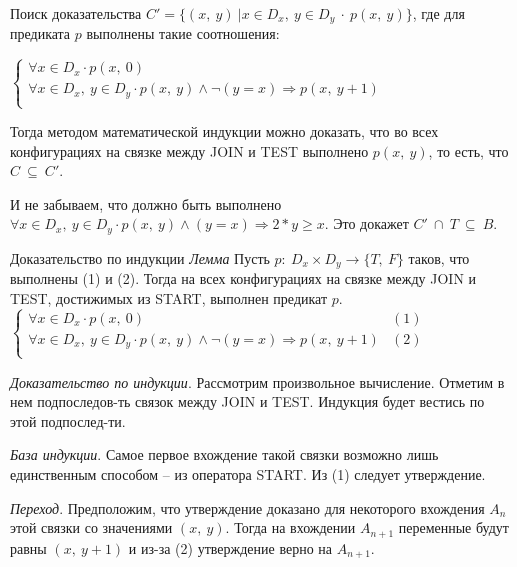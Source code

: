 \documentclass[hyperref={unicode=true}]{beamer}
\begin{document}
    \begin{frame}{Поиск доказательства}
    $C' = \{(x,~y)~|x \in D_x,~y \in D_y~\cdot~p(x,~y)\}$, где для предиката $p$ выполнены такие соотношения:

    $\begin{cases}
    \forall x \in D_x \cdot p(x,~0)\\
    \forall x \in D_x,~y \in D_y \cdot p(x,~y) \land \neg (y = x) \Rightarrow p(x,~y + 1)\\
    \end{cases}$

    Тогда методом математической индукции можно доказать, что во всех конфигурациях на связке между JOIN и TEST выполнено $p(x,~y)$, то есть, что $C~\subseteq~C'$.

    И не забываем, что должно быть выполнено $\forall x \in D_x,~y \in D_y \cdot p(x,~y) \land (y = x) \Rightarrow 2 * y \geq x$. Это докажет $C'~\cap~T~\subseteq~B$.
    \end{frame}

    \begin{frame}{Доказательство по индукции}
    \emph{Лемма} Пусть $p:~D_x \times D_y \rightarrow \{T,~F\}$ таков, что выполнены (1) и (2). Тогда на всех конфигурациях на связке между JOIN и TEST, достижимых из START, выполнен предикат $p$.
    $\begin{cases}
    \forall x \in D_x \cdot p(x,~0) & (1)\\
    \forall x \in D_x,~y \in D_y \cdot p(x,~y) \land \neg (y = x) \Rightarrow p(x,~y + 1) & (2)\\
     \end{cases}$

    \emph{Доказательство по индукции}. Рассмотрим произвольное вычисление. Отметим в нем подпоследов-ть связок между JOIN и TEST. Индукция будет вестись по этой подпослед-ти.

    \emph{База индукции}. Самое первое вхождение такой связки возможно лишь единственным способом -- из оператора START. Из (1) следует утверждение.

    \emph{Переход}. Предположим, что утверждение доказано для некоторого вхождения $A_n$ этой связки со значениями $(x,~y)$. Тогда на вхождении $A_{n+1}$ переменные будут равны $(x,~y+1)$ и из-за (2) утверждение верно на $A_{n+1}$.
    \end{frame}
\end{document}
